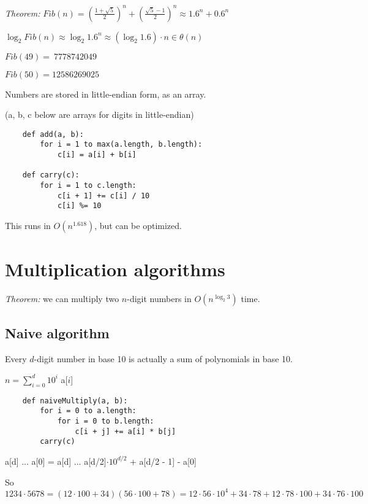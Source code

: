\documentclass[english,openany]{book}
\begin{document}
    \textit{Theorem:} $Fib(n) = \left(  \frac{1+\sqrt{5}}{2}  \right) ^n + \left(  \frac{\sqrt{5} - 1}{2}  \right) ^n \approx 1.6^n + 0.6^n$

    $\log_2 Fib(n) \approx \log_2 1.6^n \approx (\log_2 1.6) \cdot n \in \theta(n)$

    $Fib(49) =\ 7778742049$

    $Fib(50) = 12586269025$

    Numbers are stored in little-endian form, as an array.

    (a, b, c below are arrays for digits in little-endian)

    \begin{lstlisting}
    def add(a, b):
        for i = 1 to max(a.length, b.length):
            c[i] = a[i] + b[i]

    def carry(c):
        for i = 1 to c.length:
            c[i + 1] += c[i] / 10
            c[i] %= 10
    \end{lstlisting}

    This runs in $O(n^{1.618})$, but can be optimized.

    \newpage

    \section{Multiplication algorithms}

    \textit{Theorem:} we can multiply two $n$-digit numbers in $O(n^{\log_2 3})$ time.

    \subsection{Naive algorithm}

    Every $d$-digit number in base 10 is actually a sum of polynomials in base 10.

    $n = \sum_{i=0}^{d} 10^i$ a[$i$]

    \begin{lstlisting}
    def naiveMultiply(a, b):
        for i = 0 to a.length:
            for i = 0 to b.length:
                c[i + j] += a[i] * b[j]
        carry(c)
    \end{lstlisting}

    a[d] ... a[0] = a[d] ... a[d/2]$ \cdot 10^{d/2}$ + a[d/2 - 1] - a[0]

    So $1234 \cdot 5678 = (12 \cdot 100 + 34)(56 \cdot 100 + 78) = 12 \cdot 56 \cdot 10^4 + 34 \cdot 78 + 12 \cdot 78 \cdot 100 + 34 \cdot 76 \cdot 100$
\end{document}
